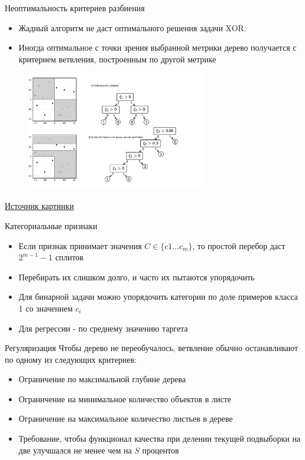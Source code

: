 \documentclass{beamer}
\begin{document}
\begin{frame}{ Неоптимальность критериев разбиения }
    \small
    \begin{itemize}
        \item  Жадный алгоритм не даст оптимального решения задачи XOR.
        \item Иногда оптимальное с точки зрения выбранной метрики дерево получается с критерием ветвления, построенным по другой метрике
    \end{itemize}
    \begin{figure}[H]
        \includegraphics[width=0.7\textwidth]{images/xor.png}
    \end{figure}
    \href{http://www.machinelearning.ru/wiki/images/archive/9/97/20140227072517!Voron-ML-Logic-slides.pdf}{Источник картинки }
\end{frame}


\begin{frame}{ Категориальные признаки}
    \small
        
    \begin{itemize}
       \item Если признак принимает значения $C \in \{ c1...c_m\}$, то простой перебор даст $2^{m-1} - 1$ сплитов
       \item Перебирать их слишком долго, и часто их пытаются упорядочить
       \item Для бинарной задачи можно упорядочить категории по доле примеров класса 1 со значением $c_i$
       \item Для регрессии - по среднему значению таргета
    \end{itemize}
\end{frame}


\begin{frame}{ Регуляризация}
    \small
    Чтобы дерево не переобучалось, ветвление обычно останавливают по одному из следующих критериев:
    \begin{itemize}
       \item Ограничение по максимальной глубине дерева
       \item Ограничение на минимальное количество объектов в листе
       \item Ограничение на максимальное количество листьев в дереве
       \item Требование, чтобы функционал качества при делении текущей подвыборки на две улучшался не менее чем на $S$ процентов
    \end{itemize}
\end{frame}
\end{document}
